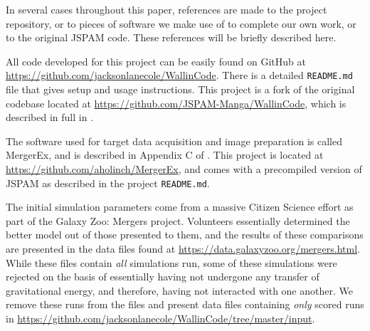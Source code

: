 In several cases throughout this paper, references are made to the project
repository, or to pieces of software we make use of to complete our own work, or
to the original JSPAM code. These references will be briefly described here.

All code developed for this project can be easily found on GitHub at
\url{https://github.com/jacksonlanecole/WallinCode}. There is a detailed
\texttt{README.md} file that gives setup and usage instructions. This project is
a fork of the original codebase located at
\url{https://github.com/JSPAM-Manga/WallinCode}, which is described in full in
\citet{Wallin2016}.

The software used for target data acquisition and image preparation is called
MergerEx, and is described in Appendix C of \citet{holincheckThesis}. This
project is located at \url{https://github.com/aholinch/MergerEx}, and comes with
a precompiled version of JSPAM as described in the project \texttt{README.md}.

The initial simulation parameters come from a massive Citizen Science effort as
part of the Galaxy Zoo: Mergers project. Volunteers essentially determined the
better model out of those presented to them, and the results of these
comparisons are presented in the data files found at
\url{https://data.galaxyzoo.org/mergers.html}. While these files contain
\textit{all} simulations run, some of these simulations were rejected on the
basis of essentially having not undergone any transfer of gravitational energy,
and therefore, having not interacted with one another. We remove these runs from
the files and present data files containing \textit{only} scored runs in
\url{https://github.com/jacksonlanecole/WallinCode/tree/master/input}.
